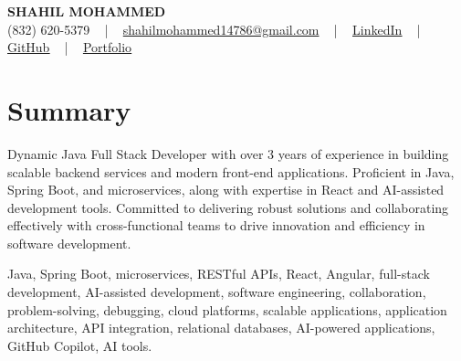 \documentclass[letterpaper,10pt]{article}
\begin{document}
\begin{center}
    {\fontsize{14pt}{12pt}\selectfont \textbf{\MakeUppercase{Shahil Mohammed}}}\\ \vspace{2pt}
    \fontsize{10pt}{12pt}\selectfont (832) 620-5379 ~ | ~ \href{mailto:shahilmohammed14786@gmail.com}{shahilmohammed14786@gmail.com} ~ | ~  
    \href{https://www.linkedin.com/in/shahil-mohammed-9652931a1/}{\color{blue}\underline{LinkedIn}}  ~ | ~ 
    \href{https://github.com/freakbeast14}{\color{blue}\underline{GitHub}} ~ | ~ 
    \href{https://shahil-mohammed.netlify.app/}{\color{blue}\underline{Portfolio}}
    \vspace{-8pt}
\end{center}

\section{Summary}
\vspace{-2pt}\fontsize{8pt}{9pt}\selectfont
Dynamic Java Full Stack Developer with over 3 years of experience in building scalable backend services and modern front-end applications. Proficient in Java, Spring Boot, and microservices, along with expertise in React and AI-assisted development tools. Committed to delivering robust solutions and collaborating effectively with cross-functional teams to drive innovation and efficiency in software development.
 \vspace{-5pt}
 
{\fontsize{1pt}{1pt}\selectfont\color{white}
Java, Spring Boot, microservices, RESTful APIs, React, Angular, full-stack development, AI-assisted development, software engineering, collaboration, problem-solving, debugging, cloud platforms, scalable applications, application architecture, API integration, relational databases, AI-powered applications, GitHub Copilot, AI tools.
}
\vspace{-8pt}

\vspace{-2pt}
\end{document}
